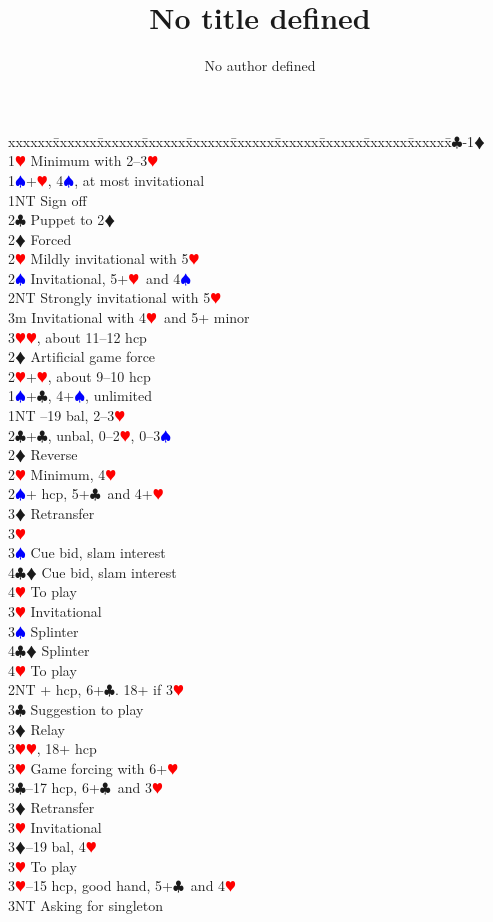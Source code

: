 \documentclass[a4paper]{article}
\title{No title defined}
\author{No author defined}
\newcommand{\BC}{\textcolor{OliveGreen}{$\clubsuit$}}
\newcommand{\BD}{\textcolor{RedOrange}{$\vardiamondsuit$}}
\newcommand{\BH}{\textcolor{Red}{$\varheartsuit${}}}
\newcommand{\BS}{\textcolor{Blue}{$\spadesuit${}}}
\newenvironment{bidtable}
{\begin{tabbing}

xxxxxx\=xxxxxx\=xxxxxx\=xxxxxx\=xxxxxx\=xxxxxx\=xxxxxx\=xxxxxx\=xxxxxx\=xxxxxx\=\kill}
{\end{tabbing} }%
\begin{document}
\maketitle
\tableofcontents

\begin{bidtable}
1\BC-1\BD\+\\
1\BH \> Minimum with 2--3\BH \+\\
1\BS {}+\BH , 4\BS , at most invitational\\
1NT \> Sign off\\
2\BC \> Puppet to 2\BD \+\\
2\BD \> Forced\+\\
2\BH \> Mildly invitational with 5\BH \\
2\BS \> Invitational, 5+\BH\ and 4\BS \\
2NT \> Strongly invitational with 5\BH \\
3m \> Invitational with 4\BH\ and 5+ minor\\
3\BH {}\BH , about 11--12 hcp\-\-\\
2\BD \> Artificial game force\\
2\BH {}+\BH , about 9--10 hcp\-\\
1\BS {}+\BC , 4+\BS , unlimited\\
1NT --19 bal, 2--3\BH \\
2\BC {}+\BC , unbal, 0--2\BH , 0--3\BS \\
2\BD \> Reverse\\
2\BH \> Minimum, 4\BH \\
2\BS {}+ hcp, 5+\BC\ and 4+\BH \+\\
3\BD \> Retransfer\+\\
3\BH\+\\
3\BS \> Cue bid, slam interest\\
4\BC\BD \> Cue bid, slam interest\\
4\BH \> To play\-\-\\
3\BH \> Invitational\\
3\BS \> Splinter\\
4\BC\BD \> Splinter\\
4\BH \> To play\-\\
2NT + hcp, 6+\BC . 18+ if 3\BH \+\\
3\BC \> Suggestion to play\\
3\BD \> Relay\+\\
3\BH {}\BH , 18+ hcp\-\\
3\BH \> Game forcing with 6+\BH \-\\
3\BC {}--17 hcp, 6+\BC\ and 3\BH \+\\
3\BD \> Retransfer\\
3\BH \> Invitational\-\\
3\BD {}--19 bal, 4\BH \+\\
3\BH \> To play\-\\
3\BH {}--15 hcp, good hand, 5+\BC\ and 4\BH \+\\
3NT \> Asking for singleton\-\-
\end{bidtable}
\end{document}
